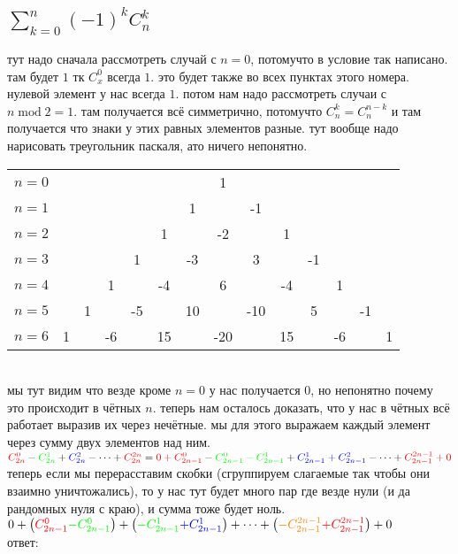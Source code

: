 \documentclass{article}
\newcommand{\ds}{\displaystyle}
\newcommand{\Cnk}[2]{C_{#1}^{#2}}
\renewcommand{\l}{\left}
\renewcommand{\r}{\right}
\newcommand{\red}[1]{{\color{red}{#1}}}
\newcommand{\orange}[1]{{\color{orange}{#1}}}
\newcommand{\green}[1]{{\color{green}{#1}}}
\newcommand{\blue}[1]{{\color{blue}{#1}}}
\begin{document}
  \subsection{$\ds \sum_{k=0}^n\l(-1\r)^k\Cnk{n}{k}$}
  тут надо сначала рассмотреть случай с $n=0$, потомучто в условие так написано.
  там будет $1$ тк $\Cnk{x}{0}$ всегда $1$. это будет также во всех пунктах этого номера.
  нулевой элемент у нас всегда $1$.
  потом нам надо рассмотреть случаи с $n \operatorname{mod} 2 = 1$. там получается всё симметрично,
  потомучто $\ds \Cnk{n}{k}=\Cnk{n}{n-k}$ и там получается что знаки у этих равных элементов разные.
  тут вообще надо нарисовать треугольник паскаля, ато ничего непонятно. \\
  \setlength\tabcolsep{0pt}
  \begin{tabular}{lccccccccccccc}
    $n=0$\hspace{12pt} &\hphantom{-10}&\hphantom{-10}&\hphantom{-10}&\hphantom{-10}&\hphantom{-10}&\hphantom{-10}&1&\hphantom{-10}&\hphantom{-10}&\hphantom{-10}&\hphantom{-10}&\hphantom{-10}&\hphantom{-10} \\
    $n=1$\hspace{12pt} &&&&&&1&\hphantom{-10}&-1&&&&& \\
    $n=2$\hspace{12pt} &&&&&1&&-2&&1&&&& \\
    $n=3$\hspace{12pt} &&&&1&&-3&&3&&-1&&& \\
    $n=4$\hspace{12pt} &&&1&&-4&&6&&-4&&1&& \\
    $n=5$\hspace{12pt} &&1&&-5&&10&&-10&&5&&-1& \\
    $n=6$\hspace{12pt} &1&&-6&&15&&-20&&15&&-6&&1 \\
  \end{tabular}
  \setlength\tabcolsep{6pt} \\
  мы тут видим что везде кроме $n=0$ у нас получается $0$, но непонятно почему это происходит в чётных $n$.
  теперь нам осталось доказать, что у нас в чётных всё работает выразив их через нечётные.
  мы для этого выражаем каждый элемент через сумму двух элементов над ним. \\
  $ \red{\Cnk{2n}{0}} - \green{\Cnk{2n}{1}} + \blue{\Cnk{2n}{2}} -\cdots+ \red{\Cnk{2n}{2n}}
  = \red{0+\Cnk{2n-1}{0}} - \green{\Cnk{2n-1}{0}-\Cnk{2n-1}{1}} + \blue{\Cnk{2n-1}{1}+\Cnk{2n-1}{2}} -\cdots+ \red{\Cnk{2n-1}{2n-1}+0} $ \\
  теперь если мы перерасставим скобки (сгруппируем слагаемые так чтобы они взаимно уничтожались),
  то у нас тут будет много пар где везде нули (и да рандомных нуля с краю), и сумма тоже будет ноль. \\
  $0+\l(\red{\Cnk{2n-1}{0}} \green{-\Cnk{2n-1}{0}}\r)+\l(\green{-\Cnk{2n-1}{1}} \blue{+\Cnk{2n-1}{1}}\r)+\cdots+\l(\orange{-\Cnk{2n-1}{2n-1}} \red{+\Cnk{2n-1}{2n-1}}\r)+0$
  \\ ответ: 
\end{document}
